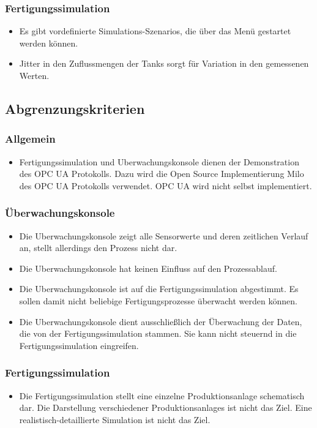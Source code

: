 \documentclass[parskip=full]{scrartcl}
\begin{document}
\subsubsection{Fertigungssimulation}
\begin{itemize}
  \item Es gibt vordefinierte \glspl{Simulations-Szenario}, die über das Menü gestartet werden können.
  \item \gls{Jitter} in den Zuflussmengen der Tanks sorgt f\"ur Variation in den gemessenen Werten.
\end{itemize}


\subsection{Abgrenzungskriterien}
\subsubsection{Allgemein}
\begin{itemize}
  \item \gls{Fertigungssimulation} und \gls{Uberwachungskonsole} dienen der Demonstration des \gls{OPC UA} Protokolls. Dazu wird die Open Source
    Implementierung \gls{Milo} des \gls{OPC UA} Protokolls verwendet. \gls{OPC UA} wird nicht selbst implementiert.
\end{itemize}

\subsubsection{Überwachungskonsole}
\begin{itemize}
  \item Die \gls{Uberwachungskonsole} zeigt alle Sensorwerte und deren zeitlichen Verlauf an, stellt allerdings den Prozess nicht dar.
  \item Die \gls{Uberwachungskonsole} hat keinen Einfluss auf den Prozessablauf.
  \item Die \gls{Uberwachungskonsole} ist auf die \gls{Fertigungssimulation} abgestimmt. Es sollen damit nicht beliebige
    Fertigungsprozesse \"uberwacht werden k\"onnen.
  \item Die \gls{Uberwachungskonsole} dient ausschlie{\ss}lich der \"Uberwachung der Daten, die von der \gls{Fertigungssimulation}
    stammen. Sie kann nicht steuernd in die \gls{Fertigungssimulation} eingreifen.
\end{itemize}

\subsubsection{Fertigungssimulation}
\begin{itemize}
  \item Die \gls{Fertigungssimulation} stellt eine einzelne \gls{Produktionsanlage} schematisch dar. Die Darstellung verschiedener \glspl{Produktionsanlage}
    ist nicht das Ziel. Eine realistisch-detaillierte Simulation ist nicht das Ziel.
\end{itemize}
\end{document}
